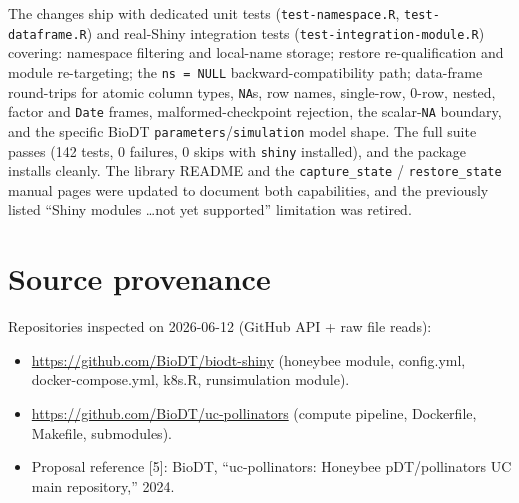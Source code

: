 \documentclass[12pt,a4paper]{article}
\begin{document}
The changes ship with dedicated unit tests (\texttt{test-namespace.R},
\texttt{test-dataframe.R}) and real-Shiny integration tests
(\texttt{test-integration-module.R}) covering: namespace filtering and local-name
storage; restore re-qualification and module re-targeting; the
\texttt{ns = NULL} backward-compatibility path; data-frame round-trips for atomic
column types, \texttt{NA}s, row names, single-row, 0-row, nested, factor and
\texttt{Date} frames, malformed-checkpoint rejection, the scalar-\texttt{NA}
boundary, and the specific BioDT \texttt{parameters}/\texttt{simulation} model
shape. The full suite passes
(142 tests, 0 failures, 0 skips with \texttt{shiny} installed), and the package
installs cleanly. The library README and the \texttt{capture\_state} /
\texttt{restore\_state} manual pages were updated to document both capabilities,
and the previously listed ``Shiny modules \dots not yet supported'' limitation
was retired.

\section{Source provenance}

Repositories inspected on 2026-06-12 (GitHub API + raw file reads):
\begin{itemize}[nosep]
  \item \url{https://github.com/BioDT/biodt-shiny} (honeybee module, config.yml,
    docker-compose.yml, k8s.R, runsimulation module).
  \item \url{https://github.com/BioDT/uc-pollinators} (compute pipeline,
    Dockerfile, Makefile, submodules).
  \item Proposal reference [5]: BioDT, ``uc-pollinators: Honeybee pDT/pollinators
    UC main repository,'' 2024.
\end{itemize}
\end{document}
